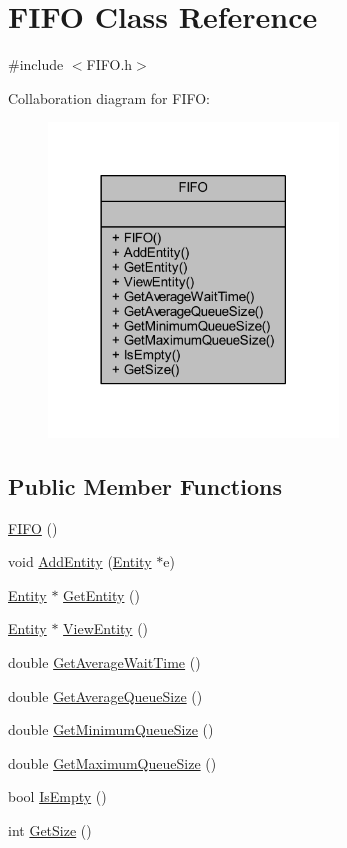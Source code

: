 \hypertarget{class_f_i_f_o}{}\section{F\+I\+FO Class Reference}
\label{class_f_i_f_o}


{\ttfamily \#include $<$F\+I\+F\+O.\+h$>$}



Collaboration diagram for F\+I\+FO\+:
\nopagebreak
\begin{figure}[H]
\begin{center}
\leavevmode
\includegraphics[width=218pt]{class_f_i_f_o__coll__graph}
\end{center}
\end{figure}
\subsection*{Public Member Functions}
\begin{DoxyCompactItemize}
\item 
\hyperlink{class_f_i_f_o_aea969385961885a8e70732482d64fead}{F\+I\+FO} ()
\item 
void \hyperlink{class_f_i_f_o_a7255ba93981ed0662bc4c26d9983dc9e}{Add\+Entity} (\hyperlink{class_entity}{Entity} $\ast$e)
\item 
\hyperlink{class_entity}{Entity} $\ast$ \hyperlink{class_f_i_f_o_a428f7532d582435ee5710641f0f87bfd}{Get\+Entity} ()
\item 
\hyperlink{class_entity}{Entity} $\ast$ \hyperlink{class_f_i_f_o_a4ce6b8e9afc3c29c9a7f1a4e0fdc81ec}{View\+Entity} ()
\item 
double \hyperlink{class_f_i_f_o_abf4a95cb154b2bb4eb6bb3750a6fce3d}{Get\+Average\+Wait\+Time} ()
\item 
double \hyperlink{class_f_i_f_o_a739f5e90efc37fcea0f66e5548132d5f}{Get\+Average\+Queue\+Size} ()
\item 
double \hyperlink{class_f_i_f_o_ad28e880c6365098995f45fc9f14121ef}{Get\+Minimum\+Queue\+Size} ()
\item 
double \hyperlink{class_f_i_f_o_a77a83086bafa4145487dd2918ed36aa4}{Get\+Maximum\+Queue\+Size} ()
\item 
bool \hyperlink{class_f_i_f_o_a8dd1be7a3e1ada7cafe5fc85a7211408}{Is\+Empty} ()
\item 
int \hyperlink{class_f_i_f_o_a67cb60ba28bfe8efd4aae30c303aa296}{Get\+Size} ()
\end{DoxyCompactItemize}


